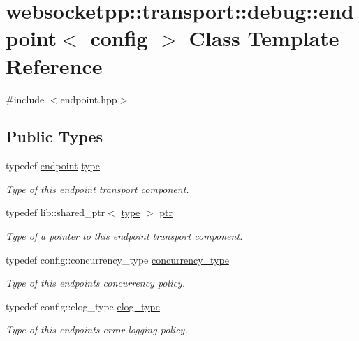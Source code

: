 \hypertarget{classwebsocketpp_1_1transport_1_1debug_1_1endpoint}{}\section{websocketpp\+:\+:transport\+:\+:debug\+:\+:endpoint$<$ config $>$ Class Template Reference}
\label{classwebsocketpp_1_1transport_1_1debug_1_1endpoint}


{\ttfamily \#include $<$endpoint.\+hpp$>$}

\subsection*{Public Types}
\begin{DoxyCompactItemize}
\item 
typedef \hyperlink{classwebsocketpp_1_1transport_1_1debug_1_1endpoint}{endpoint} \hyperlink{classwebsocketpp_1_1transport_1_1debug_1_1endpoint_ad8bdfc73f0351c08dbe64143cd224ac0}{type}
\begin{DoxyCompactList}\small\item\em Type of this endpoint transport component. \end{DoxyCompactList}\item 
typedef lib\+::shared\+\_\+ptr$<$ \hyperlink{classwebsocketpp_1_1transport_1_1debug_1_1endpoint_ad8bdfc73f0351c08dbe64143cd224ac0}{type} $>$ \hyperlink{classwebsocketpp_1_1transport_1_1debug_1_1endpoint_a947f3252f16c34680638f0ed9ef95aa3}{ptr}
\begin{DoxyCompactList}\small\item\em Type of a pointer to this endpoint transport component. \end{DoxyCompactList}\item 
typedef config\+::concurrency\+\_\+type \hyperlink{classwebsocketpp_1_1transport_1_1debug_1_1endpoint_adbe41c60a84f148cbdce15a0535ac2e9}{concurrency\+\_\+type}
\begin{DoxyCompactList}\small\item\em Type of this endpoint\textquotesingle{}s concurrency policy. \end{DoxyCompactList}\item 
typedef config\+::elog\+\_\+type \hyperlink{classwebsocketpp_1_1transport_1_1debug_1_1endpoint_a3616bf82ba2a1026fad9de8145bd9375}{elog\+\_\+type}
\begin{DoxyCompactList}\small\item\em Type of this endpoint\textquotesingle{}s error logging policy. \end{DoxyCompactList}\item 

\end{DoxyCompactItemize}
